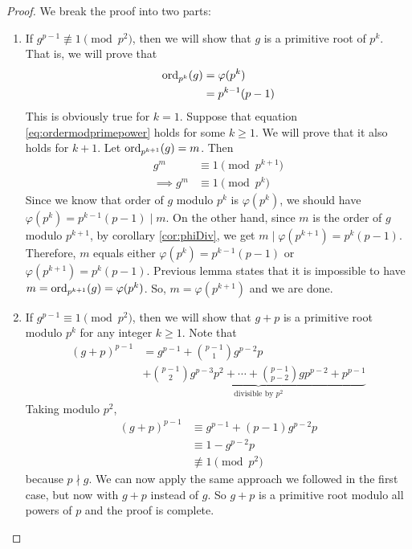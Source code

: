 \documentclass{subfile}
\begin{document}
	\begin{proof}
		We break the proof into two parts:
		\begin{enumerate}
			\item If $g^{p-1} \not \equiv 1 \pmod{p^2}$, then we will show that $g$ is a primitive root of $p^k$. That is, we will prove that
				\begin{align}\label{eq:ordermodprimepower}
					\operatorname{ord}_{p^k} (g)
						& =\varphi(p^k)\\
						& =p^{k-1}(p-1)
				\end{align}
			This is obviously true for $k=1$. Suppose that equation \eqref{eq:ordermodprimepower} holds for some $k\geq 1$. We will prove that it also holds for $k+1$. Let $\operatorname{ord}_{p^{k+1}} (g)=m$. Then
				\begin{align*}
					g^m
						& \equiv 1 \pmod{p^{k+1}}\\
					\implies g^m
						& \equiv 1 \pmod{p^{k}}
				\end{align*}
			Since we know that order of $g$ modulo $p^k$ is $\varphi(p^k)$, we should have $\varphi(p^k)=p^{k-1}(p-1)\mid m$. On the other hand, since $m$ is the order of $g$ modulo $p^{k+1}$, by corollary \eqref{cor:phiDiv}, we get $m\mid \varphi(p^{k+1})=p^k(p-1)$. Therefore, $m$ equals either $\varphi(p^k)=p^{k-1}(p-1)$ or $\varphi(p^{k+1})=p^{k}(p-1)$. Previous lemma states that it is impossible to have $m=\operatorname{ord}_{p^{k+1}} (g)=\varphi(p^k)$. So, $m=\varphi(p^{k+1})$ and we are done.

			\item If $g^{p-1} \equiv 1 \pmod{p^2}$, then we will show that $g+p$ is a primitive root modulo $p^k$ for any integer $k\geq 1$. Note that
				\begin{align*}
					(g+p)^{p-1}
						& = g^{p-1} + \binom{p-1}{1} g^{p-2}p \\
						& + \underbrace{\binom{p-1}{2}g^{p-3}p^2+\cdots + \binom{p-1}{p-2} gp^{p-2} + p^{p-1}}_{\mbox{divisible by } p^2}
				\end{align*}
			Taking modulo $p^2$,
				\begin{align*}
					(g+p)^{p-1}
						& \equiv g^{p-1}+(p-1)g^{p-2}p\\
						& \equiv 1 - g^{p-2}p\\
						& \not \equiv 1 \pmod{p^2}
				\end{align*}
			because $p \nmid g$. We can now apply the same approach we followed in the first case, but now with $g+p$ instead of $g$. So $g+p$ is a primitive root modulo all powers of $p$ and the proof is complete.
		\end{enumerate}
	\end{proof}
\end{document}
